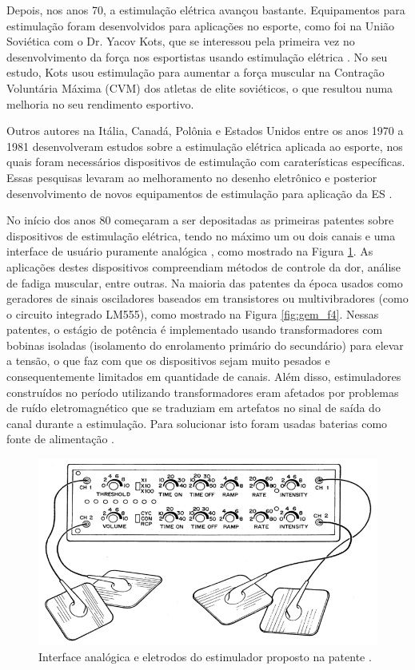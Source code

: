 Depois, nos anos 70, a estimulação elétrica avançou bastante. Equipamentos para estimulação foram desenvolvidos para aplicações no esporte, como foi na União Soviética com o Dr. Yacov Kots, que se interessou pela primeira vez no desenvolvimento da força nos esportistas usando estimulação elétrica \cite{Cometti2007}. No seu estudo, Kots usou estimulação para aumentar a força muscular na Contração Voluntária Máxima (\acrshort{CVM}) dos atletas de elite soviéticos, o que resultou numa melhoria no seu rendimento esportivo.

Outros autores na Itália, Canadá, Polônia e Estados Unidos entre os anos 1970 a 1981 desenvolveram estudos sobre a estimulação elétrica aplicada ao esporte, nos quais foram necessários dispositivos de estimulação com caraterísticas específicas. Essas pesquisas levaram ao melhoramento no desenho eletrônico e posterior desenvolvimento de novos equipamentos de estimulação para aplicação da \acrshort{ES} \cite{Cometti2007, Martin2014}.

No início dos anos 80 começaram a ser depositadas as primeiras patentes sobre dispositivos de estimulação elétrica, tendo no máximo um ou dois canais e uma interface de usuário puramente analógica \cite{Hudleson1980, Agarwala1986, H.1990, Reiss1996}, como mostrado na Figura \ref{fig:ian_f3}. As aplicações destes dispositivos compreendiam métodos de controle da dor, análise de fadiga muscular, entre outras. Na maioria das patentes da época usados como geradores de sinais osciladores baseados em transistores ou multivibradores (como o circuito integrado LM555), como mostrado na Figura \ref{fig:gem_f4}. Nessas patentes, o estágio de potência é implementado usando transformadores com bobinas isoladas (isolamento do enrolamento primário do secundário) para elevar a tensão, o que faz com que os dispositivos sejam muito pesados e consequentemente limitados em quantidade de canais. Além disso, estimuladores construídos no período utilizando transformadores eram afetados por problemas de ruído eletromagnético que se traduziam em artefatos no sinal de saída do canal durante a estimulação. Para solucionar isto foram usadas baterias como fonte de alimentação \cite{Jaw1995, Hudleson1980}.

\begin{figure}
    \centering %
    \includegraphics[width=0.7\linewidth]{figs/Fig_c3/ian_f3}
    \caption{Interface analógica e eletrodos do estimulador proposto na patente  \cite{Reiss1996}.}
    \label{fig:ian_f3}
\end{figure}

